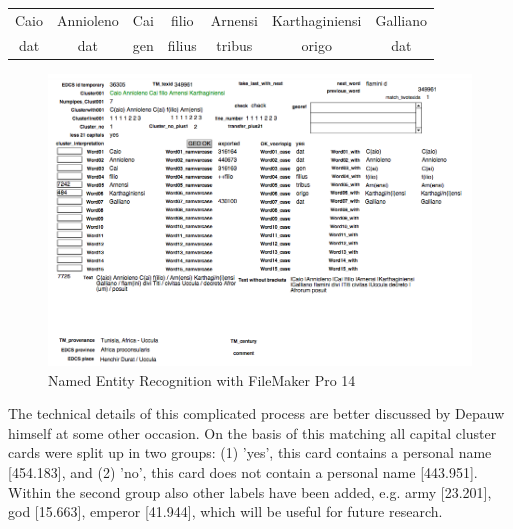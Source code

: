 \documentclass[amsthm,ebook]{saparticle}
\begin{document}
\begin{table}[htp]
\begin{center}
\begin{tabular}{ccccccc}
Caio & Annioleno & Cai & filio & Arnensi & Karthaginiensi & Galliano\\
dat & dat & gen & filius & tribus & origo & dat\\
\end{tabular}
\end{center}
\label{Example}
\end{table}%

\begin{figure}[!hbp]
\centering
 \includegraphics[width=\columnwidth]{EAGLE2016FullPaperVerreth-img001.png}
\caption{Named Entity Recognition with FileMaker Pro 14}
\label{fig:1}
\end{figure}
 




The technical details of this complicated process are better discussed by Depauw himself at some other occasion. On the
basis of this matching all capital cluster cards were split up in two groups: (1) 'yes', this card contains a personal
name [454.183], and (2) 'no', this card does not contain a personal name [443.951]. Within the second group also other
labels have been added, e.g. army [23.201], god [15.663], emperor [41.944], which will be useful for future research.
\end{document}
